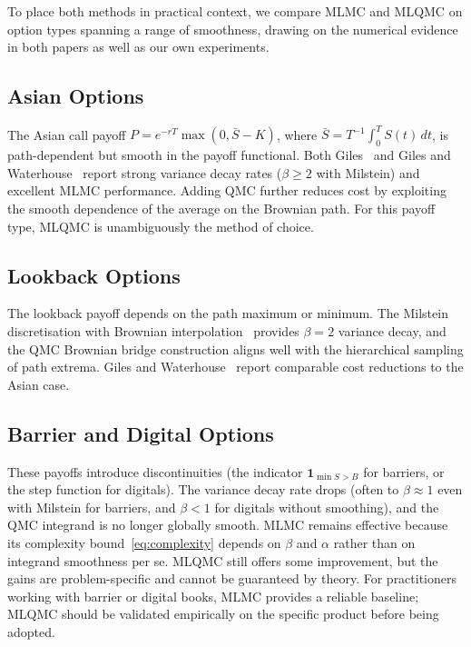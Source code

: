 \documentclass[11pt]{article}
\begin{document}
To place both methods in practical context, we compare MLMC and MLQMC on option types spanning a range of smoothness, drawing on the numerical evidence in both papers as well as our own experiments.

\subsection{Asian Options}

The Asian call payoff $P = e^{-rT}\max(0,\bar{S} - K)$, where $\bar{S} = T^{-1}\int_{0}^{T}S(t)\,dt$, is path-dependent but smooth in the payoff functional. Both Giles~\cite{giles2008} and Giles and Waterhouse~\cite{giles2009} report strong variance decay rates ($\beta \ge 2$ with Milstein) and excellent MLMC performance. Adding QMC further reduces cost by exploiting the smooth dependence of the average on the Brownian path. For this payoff type, MLQMC is unambiguously the method of choice.

\subsection{Lookback Options}

The lookback payoff depends on the path maximum or minimum. The Milstein discretisation with Brownian interpolation~\cite{giles2008b} provides $\beta = 2$ variance decay, and the QMC Brownian bridge construction aligns well with the hierarchical sampling of path extrema. Giles and Waterhouse~\cite{giles2009} report comparable cost reductions to the Asian case.

\subsection{Barrier and Digital Options}

These payoffs introduce discontinuities (the indicator $\mathbf{1}_{\min S > B}$ for barriers, or the step function for digitals). The variance decay rate drops (often to $\beta \approx 1$ even with Milstein for barriers, and $\beta < 1$ for digitals without smoothing), and the QMC integrand is no longer globally smooth. MLMC remains effective because its complexity bound~\eqref{eq:complexity} depends on $\beta$ and $\alpha$ rather than on integrand smoothness per se. MLQMC still offers some improvement, but the gains are problem-specific and cannot be guaranteed by theory. For practitioners working with barrier or digital books, MLMC provides a reliable baseline; MLQMC should be validated empirically on the specific product before being adopted.
\end{document}
